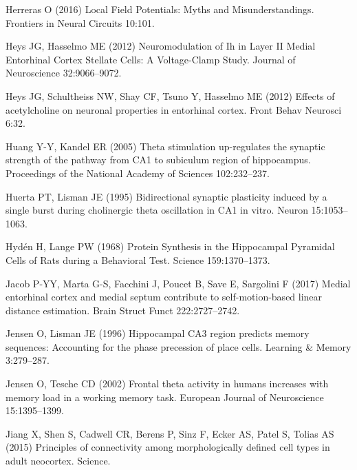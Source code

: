 \documentclass[
  12pt,
  a4paper,
  openany]{book}
\newlength{\cslhangindent}
\newlength{\cslentryspacingunit} %
\newenvironment{CSLReferences}[2] %
 {%
  \setlength{\parindent}{0pt}
  \ifodd #1
  \let\oldpar\par
  \def\par{\hangindent=\cslhangindent\oldpar}
  \fi
  \setlength{\parskip}{#2\cslentryspacingunit}
 }%
 {}
\begin{document}
\begin{CSLReferences}{1}{0}
\leavevmode{}%
Herreras O (2016) Local {Field} {Potentials}: {Myths} and {Misunderstandings}. Frontiers in Neural Circuits 10:101.

\leavevmode{}%
Heys JG, Hasselmo ME (2012) Neuromodulation of {Ih} in {Layer} {II} {Medial} {Entorhinal} {Cortex} {Stellate} {Cells}: {A} {Voltage}-{Clamp} {Study}. Journal of Neuroscience 32:9066--9072.

\leavevmode{}%
Heys JG, Schultheiss NW, Shay CF, Tsuno Y, Hasselmo ME (2012) Effects of acetylcholine on neuronal properties in entorhinal cortex. Front Behav Neurosci 6:32.

\leavevmode{}%
Huang Y-Y, Kandel ER (2005) Theta stimulation up-regulates the synaptic strength of the pathway from {CA1} to subiculum region of hippocampus. Proceedings of the National Academy of Sciences 102:232--237.

\leavevmode{}%
Huerta PT, Lisman JE (1995) Bidirectional synaptic plasticity induced by a single burst during cholinergic theta oscillation in {CA1} in vitro. Neuron 15:1053--1063.

\leavevmode{}%
Hydén H, Lange PW (1968) Protein {Synthesis} in the {Hippocampal} {Pyramidal} {Cells} of {Rats} during a {Behavioral} {Test}. Science 159:1370--1373.

\leavevmode{}%
Jacob P-YY, Marta G-S, Facchini J, Poucet B, Save E, Sargolini F (2017) Medial entorhinal cortex and medial septum contribute to self-motion-based linear distance estimation. Brain Struct Funct 222:2727--2742.

\leavevmode{}%
Jensen O, Lisman JE (1996) Hippocampal {CA3} region predicts memory sequences: Accounting for the phase precession of place cells. Learning \& Memory 3:279--287.

\leavevmode{}%
Jensen O, Tesche CD (2002) Frontal theta activity in humans increases with memory load in a working memory task. European Journal of Neuroscience 15:1395--1399.

\leavevmode{}%
Jiang X, Shen S, Cadwell CR, Berens P, Sinz F, Ecker AS, Patel S, Tolias AS (2015) Principles of connectivity among morphologically defined cell types in adult neocortex. Science.


\end{CSLReferences}
\end{document}
